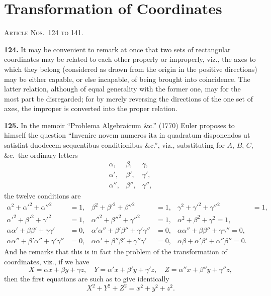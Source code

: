 \documentclass[11pt,a4paper]{book}
\begin{document}
\section*{Transformation of Coordinates}
\noindent\textsc{Article Nos.~124 to 141.}

\medskip

\textbf{124.} It may be convenient to remark at once that two sets of rectangular coordinates may be related to each other properly or improperly, viz., the axes to which they belong (considered as drawn from the origin in the positive directions) may be either capable, or else incapable, of being brought into coincidence. The latter relation, although of equal generality with the former one, may for the most part be disregarded; for by merely reversing the directions of the one set of axes, the improper is converted into the proper relation.

\textbf{125.} In the memoir ``Problema Algebraicum \&c.'' (1770) Euler proposes to himself the question ``Invenire novem numeros ita in quadratum disponendos ut satisfiat duodecem sequentibus conditionibus \&c.'', viz., substituting for $A$, $B$, $C$, \&c.\ the ordinary letters
\[
\begin{array}{ccc}
\alpha, & \beta, & \gamma, \\
\alpha', & \beta', & \gamma', \\
\alpha'', & \beta'', & \gamma'',
\end{array}
\]
the twelve conditions are
\begin{align*}
\alpha^2 + \alpha'^2 + \alpha''^2 &= 1, & \beta^2 + \beta'^2 + \beta''^2 &= 1, & \gamma^2 + \gamma'^2 + \gamma''^2 &= 1, \\
\alpha'^2 + \beta'^2 + \gamma'^2 &= 1, & \alpha''^2 + \beta''^2 + \gamma''^2 &= 1, & \alpha^2 + \beta^2 + \gamma^2 = 1, \\
\alpha\alpha' + \beta\beta' + \gamma\gamma' &= 0, & \alpha'\alpha'' + \beta'\beta'' + \gamma'\gamma'' &= 0, & \alpha\alpha'' + \beta\beta'' + \gamma\gamma'' = 0, \\
\alpha\alpha'' + \beta'\alpha'' + \gamma'\gamma'' &= 0, & \alpha\alpha' + \beta''\beta' + \gamma''\gamma' &= 0, & \alpha\beta + \alpha'\beta' + \alpha''\beta'' = 0.
\end{align*}
And he remarks that this is in fact the problem of the transformation of coordinates, viz., if we have
\[
X = \alpha x + \beta y + \gamma z, \quad Y = \alpha' x + \beta' y + \gamma' z, \quad Z = \alpha'' x + \beta'' y + \gamma'' z,
\]
then the first equations are such as to give identically
\[
X^2 + Y^2 + Z^2 = x^2 + y^2 + z^2.
\]
\end{document}
